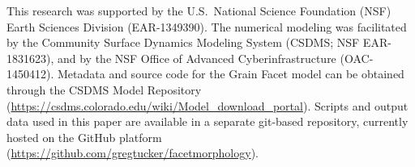 





%
%
%

%
%


%
 

%




%

\acknowledgments
This research was supported by the U.S.\ National Science Foundation (NSF) Earth Sciences Division (EAR-1349390). The numerical modeling was facilitated by the Community Surface Dynamics Modeling System (CSDMS; NSF EAR-1831623), and by the NSF Office of Advanced Cyberinfrastructure (OAC-1450412). Metadata and source code for the Grain Facet model can be obtained through the CSDMS Model Repository (\url{https://csdms.colorado.edu/wiki/Model_download_portal}). Scripts and output data used in this paper are available in a separate git-based repository, currently hosted on the GitHub platform (\url{https://github.com/gregtucker/facetmorphology}).


%
%
%
%
%
%
%
%
%



